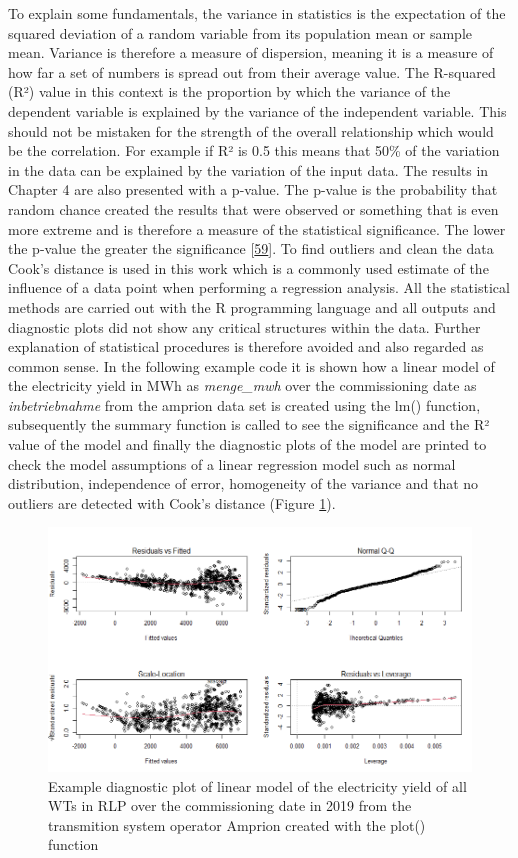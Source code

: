 \documentclass[a4paper,11pt]{article}
\begin{document}
To explain some fundamentals, the variance in statistics is the expectation of the squared deviation of a random variable from its population mean or sample mean. Variance is therefore a measure of dispersion, meaning it is a measure of how far a set of numbers is spread out from their average value. The R-squared (R²) value in this context is the proportion by which the variance of the dependent variable is explained by the variance of the independent variable. This should not be mistaken for the strength of the overall relationship which would be the correlation. For example if R² is 0.5 this means that 50\% of the variation in the data can be explained by the variation of the input data. The results in Chapter 4 are also presented with a p-value. The p-value is the probability that random chance created the results that were observed or something that is even more extreme and is therefore a measure of the statistical significance. The lower the p-value the greater the significance {[}\protect\hyperlink{ref-LeoH.Kahane.2006}{59}{]}. To find outliers and clean the data Cook's distance is used in this work which is a commonly used estimate of the influence of a data point when performing a regression analysis. All the statistical methods are carried out with the R programming language and all outputs and diagnostic plots did not show any critical structures within the data. Further explanation of statistical procedures is therefore avoided and also regarded as common sense. In the following example code it is shown how a linear model of the electricity yield in MWh as \emph{menge\_mwh} over the commissioning date as \emph{inbetriebnahme} from the amprion data set is created using the lm() function, subsequently the summary function is called to see the significance and the R² value of the model and finally the diagnostic plots of the model are printed to check the model assumptions of a linear regression model such as normal distribution, independence of error, homogeneity of the variance and that no outliers are detected with Cook's distance (Figure \ref{fig:diagnostics}).
\begin{figure}[H]

{\centering \includegraphics[width=1\linewidth]{figures/diagnostics} 

}

\caption{Example diagnostic plot of linear model of the electricity yield of all WTs in RLP over the commissioning date in 2019 from the transmition system operator Amprion created with the plot() function}\label{fig:diagnostics}
\end{figure}
\end{document}
